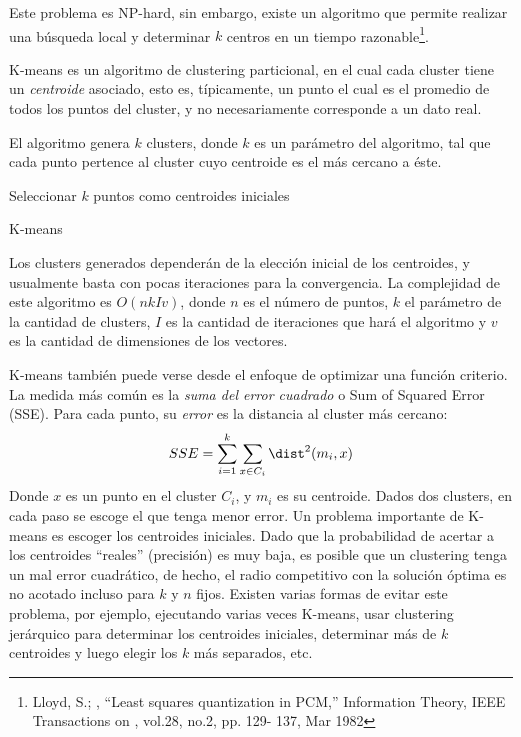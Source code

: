 \documentclass[upright, contnum]{umemoria}
\begin{document}
    Este problema es NP-hard, sin embargo, existe un algoritmo que
    permite realizar una búsqueda local y determinar $k$ centros 
    en un tiempo razonable\footnote{Lloyd, S.; , ``Least squares quantization in PCM,'' Information Theory, IEEE Transactions on , vol.28, no.2, pp. 129- 137, Mar 1982 }.
    
    K-means es un algoritmo de clustering particional, en el cual cada
    cluster tiene un \emph{centroide} asociado, esto es, típicamente, un punto
    el cual es el promedio de todos los puntos del cluster, y no
    necesariamente corresponde a un dato real.
    
    El algoritmo genera $k$ clusters, donde $k$ es un parámetro del
    algoritmo, tal que cada punto pertence al cluster cuyo centroide es el
    más cercano a éste.
    
\begin{algorithm}[H]
 Seleccionar $k$ puntos como centroides iniciales\;
 \caption{K-means}
\end{algorithm}

    Los clusters generados dependerán de la elección inicial de los
    centroides, y usualmente basta con pocas iteraciones para la
    convergencia. La complejidad de este algoritmo es $O(nkIv)$, donde $n$
    es el número de puntos, $k$ el parámetro de la cantidad de clusters,
    $I$ es la cantidad de iteraciones que hará el algoritmo y $v$ es la
    cantidad de dimensiones de los vectores.

    K-means también puede verse desde el enfoque de optimizar una
    función criterio. La medida más común es la 
    \emph{suma del error cuadrado} o Sum of Squared Error (SSE). Para cada
    punto, su \emph{error} es la distancia al cluster más cercano:
    $$SSE = \sum_{i=1}^k\sum_{x\in C_i} \dist^2(m_i,x)$$
    Donde $x$ es un punto en el cluster $C_i$, y $m_i$ es su
    centroide. Dados dos clusters, en cada paso se escoge el que tenga
    menor error.
    Un problema importante de K-means es escoger los centroides
    iniciales. Dado que la probabilidad de acertar a los centroides
    ``reales'' (precisión) es muy baja, es posible que un clustering
    tenga un mal error cuadrático, de hecho, el radio competitivo con
    la solución óptima es no acotado incluso para $k$ y $n$ fijos. 
    Existen varias formas de evitar
    este problema, por ejemplo, ejecutando varias veces K-means, 
    usar clustering jerárquico para determinar los centroides
    iniciales, determinar más de $k$ centroides y luego elegir los $k$
    más separados, etc.
\end{document}
